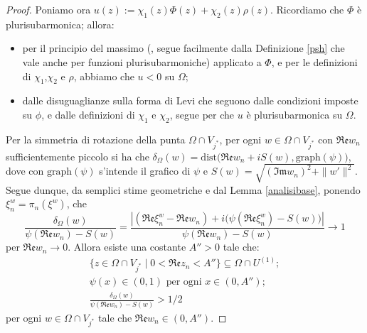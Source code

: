 \begin{proof}
    Poniamo ora $u(z):=\chi_1(z)\Phi(z)+\chi_2(z)\rho(z)$. Ricordiamo che $\Phi$ è plurisubarmonica; allora:
    \begin{itemize}
        \item per il principio del massimo (\cite[Corollary 2.1.5]{Kr}, segue facilmente dalla Definizione \ref{psh} che vale anche per funzioni plurisubarmoniche) applicato a $\Phi$, e per le definizioni di $\chi_1$,$\chi_2$ e $\rho$, abbiamo che $u<0$ su $\Omega$;
        \item dalle disuguaglianze sulla forma di Levi che seguono dalle condizioni imposte su $\phi$, e dalle definizioni di $\chi_1$ e $\chi_2$, segue per \cite[Excercise prior to Proposition 2.2.6]{Kr} che $u$ è plurisubarmonica su $\Omega$.
    \end{itemize}

    Per la simmetria di rotazione della punta $\Omega\cap V_{j^*}$, per ogni $w\in\Omega\cap V_{j^*}$ con $\mathfrak{Re}w_n$ sufficientemente piccolo si ha che $\delta_\Omega(w)=\text{dist}\big(\mathfrak{Re}w_n+iS(w),\text{graph}(\psi)\big)$, dove con $\text{graph}(\psi)$ s'intende il grafico di $\psi$ e $S(w)=\sqrt{(\mathfrak{Im}w_n)^2+\|w'\|^2}$. Segue dunque, da semplici stime geometriche e dal Lemma \ref{analisibase}, ponendo $\xi^w_n=\pi_n(\xi^w)$, che
    \begin{equation}\label{limite_brutto}
        \frac{\delta_\Omega(w)}{\psi(\mathfrak{Re}w_n)-S(w)}=\frac{\left|(\mathfrak{Re}\xi^w_n-\mathfrak{Re}w_n)+i\big(\psi(\mathfrak{Re}\xi^w_n)-S(w)\big)\right|}{\psi(\mathfrak{Re}w_n)-S(w)}\longrightarrow 1
    \end{equation}
    per $\mathfrak{Re}w_n\longrightarrow 0$. Allora esiste una costante $A''>0$ tale che:
    \begin{gather}
        \{z\in\Omega\cap V_{j^*}\mid0<\mathfrak{Re}z_n<A''\}\subseteq\Omega\cap U^{(1)};\label{7punto4}\\
        \psi(x)\in(0,1)\text{ per ogni }x\in(0,A'');\label{7punto4due}\\
        \frac{\delta_\Omega(w)}{\psi(\mathfrak{Re}w_n)-S(w)}>1/2\label{7punto5}
    \end{gather}
    per ogni $w\in\Omega\cap V_{j^*}$ tale che $\mathfrak{Re}w_n\in(0,A'')$.


\end{proof}
